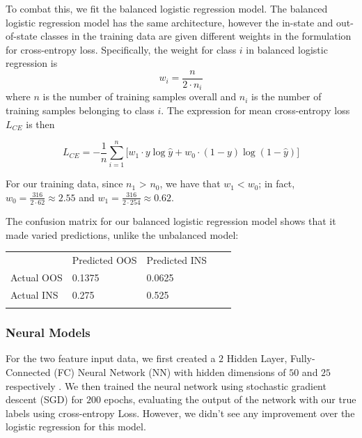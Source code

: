 \documentclass{article}
\begin{document}
To combat this, we fit the balanced logistic regression model. The balanced logistic regression model has the same architecture, however the in-state and out-of-state classes in the training data are given different weights in the formulation for cross-entropy loss. Specifically, the weight for class $i$ in balanced logistic regression is $$w_i = \frac{n}{2 \cdot n_i}$$ where $n$ is the number of training samples overall and $n_i$ is the number of training samples belonging to class $i$. The expression for mean cross-entropy loss $L_{CE}$ is then

$$L_{CE} = -\frac{1}{n} \sum_{i = 1}^n \big[w_1 \cdot y \log \hat{y} + w_0 \cdot (1-y)\log (1-\hat{y}) \big]$$

For our training data, since $n_1$ > $n_0$, we have that $w_1 < w_0$; in fact, $w_0 = \frac{316}{2 \cdot 62} \approx 2.55$ and $w_1 = \frac{316}{2 \cdot 254} \approx 0.62$.

The confusion matrix for our balanced logistic regression model shows that it made varied predictions, unlike the unbalanced model:

\begin{table}[htb]
\centering
\begin{tabular}{lllll}
\cline{1-3}
\multicolumn{1}{|l|}{} & \multicolumn{1}{l|}{Predicted OOS} & \multicolumn{1}{l|}{Predicted INS} &  &  \\ \cline{1-3}
\multicolumn{1}{|l|}{Actual OOS} & \multicolumn{1}{l|}{0.1375} & \multicolumn{1}{l|}{0.0625} &  &  \\ \cline{1-3}
\multicolumn{1}{|l|}{Actual INS} & \multicolumn{1}{l|}{0.275} & \multicolumn{1}{l|}{0.525} &  &  \\ \cline{1-3}
 &  &  &  & 
\end{tabular}
\end{table}

\subsubsection{Neural Models}

For the two feature input data, we first created a $2$ Hidden Layer, Fully-Connected (FC) Neural Network (NN) with hidden dimensions of $50$ and $25$ respectively \cite{shewchuk}. We then trained the neural network using stochastic gradient descent (SGD) for $200$ epochs, evaluating the output of the network with our true labels using cross-entropy Loss. However, we didn't see any improvement over the logistic regression for this model.
\end{document}
